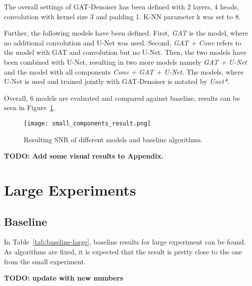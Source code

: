 The overall settings of GAT-Denoiser has been defined with 2 layers, 4 heads, convolution with 
kernel size 3 and padding 1. K-NN parameter k was set to 8.

Further, the following models have been defined.
First, \textit{GAT} is the model, where no additional convolution and 
U-Net was used. Second, \textit{GAT + Conv} refers to the model 
with GAT and convolution but no U-Net.
Then, the two models have been combined with U-Net, resulting in two more models
namely \textit{GAT + U-Net} and the model with all components \textit{Conv + GAT + U-Net}.
The models, where U-Net is used and trained jointly with GAT-Denoiser is 
notated by \textit{Unet*}. 

Overall, 6 models are evaluated and compared against baseline, results can be seen in Figure~\ref{fig:small_components}.

\begin{figure}[H]
  \centering
  \label{fig:small_components}
  \texttt{[image: small\_components\_result.png]}
  \caption{
    Resulting SNR of different models and baseline algorithms.
    }
\end{figure}


\textbf{TODO: Add some visual results to Appendix.}


\section{Large Experiments}

\subsection{Baseline}
In Table~\ref{tab:baseline-large}, baseline results for large experiment can be found.
As algorithms are fixed, it is expected that the result is pretty close to the one from the small experiment.

\textbf{TODO: update with new numbers}

